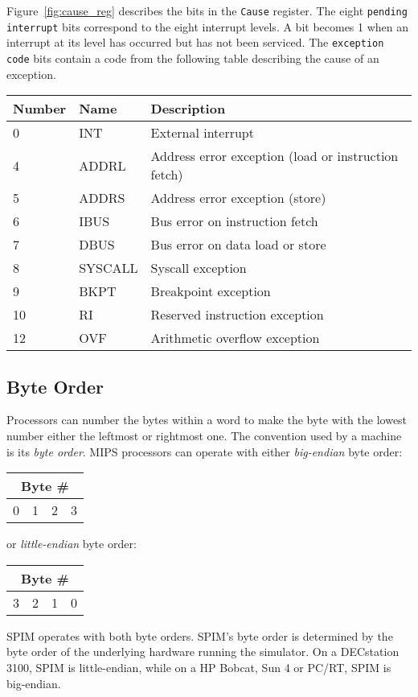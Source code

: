 \documentclass[11pt]{article}
\begin{document}
Figure~\ref{fig:cause_reg} describes the bits in the {\tt Cause}
register.  The eight {\tt pending interrupt} bits correspond to the
eight interrupt levels.  A bit becomes 1 when an interrupt at its level
has occurred but has not been serviced.  The {\tt exception code}
bits contain a code from the following table describing the cause
of an exception.
\begin{center}
  \small
  \begin{tabular}{|l|l|l|}
    \hline
    {\bf Number} & {\bf Name} & {\bf Description} \\
    \hline
    \hline
    0 & INT & External interrupt \\
    4 & ADDRL & Address error exception (load or instruction fetch) \\
    5 & ADDRS & Address error exception (store) \\
    6 & IBUS & Bus error on instruction fetch \\
    7 & DBUS & Bus error on data load or store \\
    8 & SYSCALL & Syscall exception \\
    9 & BKPT & Breakpoint exception \\
    10&  RI & Reserved instruction exception \\
    12&  OVF & Arithmetic overflow exception \\
    \hline
  \end{tabular}
\end{center}

\subsection{Byte Order}

Processors can number the bytes within a word to make the byte with
the lowest number either the leftmost or rightmost one.  The convention
used by a machine is its {\em byte order\/}.  MIPS processors can
operate with either {\em big-endian\/} byte order:
\begin{center}
  \begin{tabular}{|c|c|c|c|}
    \multicolumn{4}{c}{{\bf Byte \#}} \\
    \hline
    0 & 1 & 2 & 3 \\
    \hline
  \end{tabular}
\end{center}
or {\em little-endian\/} byte order:
\begin{center}
  \begin{tabular}{|c|c|c|c|}
    \multicolumn{4}{c}{{\bf Byte \#}} \\
    \hline
    3 & 2 & 1 & 0 \\
    \hline
  \end{tabular}
\end{center}
SPIM operates with both byte orders.  SPIM's byte order is determined
by the byte order of the underlying hardware running the simulator.
On a DECstation 3100, SPIM is little-endian, while on a HP Bobcat, Sun
4 or PC/RT, SPIM is big-endian.
\end{document}
